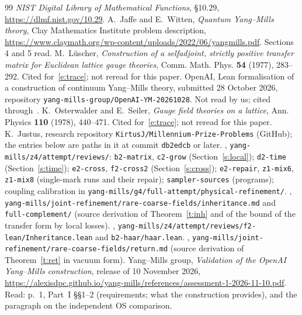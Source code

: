 \begin{thebibliography}{99}
 \emph{NIST Digital Library of Mathematical Functions}, \S10.29, \url{https://dlmf.nist.gov/10.29}.
 A.~Jaffe and E.~Witten, \emph{Quantum Yang--Mills theory}, Clay Mathematics Institute problem
description, \url{https://www.claymath.org/wp-content/uploads/2022/06/yangmills.pdf}. Sections 4 and 5 read.
 M.~L\"uscher, \emph{Construction of a selfadjoint, strictly positive transfer matrix for
Euclidean lattice gauge theories}, Comm. Math. Phys. \textbf{54} (1977), 283--292. Cited for~\eqref{e:trace};
not reread for this paper.
 OpenAI, Lean formalisation of a construction of continuum Yang--Mills theory, submitted
28 October 2026, repository \texttt{yang-mills-group/OpenAI-YM-20261028}. Not read by us; cited through~\cite{YMG}.
 K.~Osterwalder and E.~Seiler, \emph{Gauge field theories on a lattice}, Ann. Physics
\textbf{110} (1978), 440--471. Cited for~\eqref{e:trace}; not reread for this paper.
 K.~Justus, research repository \texttt{KirtusJ/Millennium-Prize-Problems} (GitHub); the
entries below are paths in it at commit \texttt{db2edcb} or later.
 \cite{Repo}, \texttt{yang-mills/z4/attempt/reviews/}: \texttt{b2-matrix}, \texttt{c2-grow}
(Section~\ref{s:local}); \texttt{d2-time} (Section~\ref{s:time}); \texttt{e2-cross}, \texttt{f2-cross2}
(Section~\ref{s:cross}); \texttt{e2-repair}, \texttt{z1-mix6}, \texttt{z1-mix8} (single-mark runs and their
repair); \texttt{sampler-sources} (programs); coupling calibration in
\texttt{yang-mills/g4/full-attempt/physical-refinement/}.
 \cite{Repo}, \texttt{yang-mills/joint-refinement/rare-coarse-fields/inheritance.md} and
\texttt{full-complement/} (source derivation of Theorem~\ref{t:inh} and of the bound of the transfer form by
local losses).
 \cite{Repo}, \texttt{yang-mills/z4/attempt/reviews/f2-lean/Inheritance.lean} and
\texttt{b2-haar/haar.lean}.
 \cite{Repo}, \texttt{yang-mills/joint-refinement/rare-coarse-fields/return.md} (source
derivation of Theorem~\ref{t:ret} in vacuum form).
 Yang--Mills group, \emph{Validation of the OpenAI Yang--Mills construction}, release of
10 November 2026, \url{https://alexisdpc.github.io/yang-mills/references/assessment-1-2026-11-10.pdf}. Read:
p.~1, Part~I \S\S1--2 (requirements; what the construction provides), and the paragraph on the independent
OS comparison.
\end{thebibliography}

